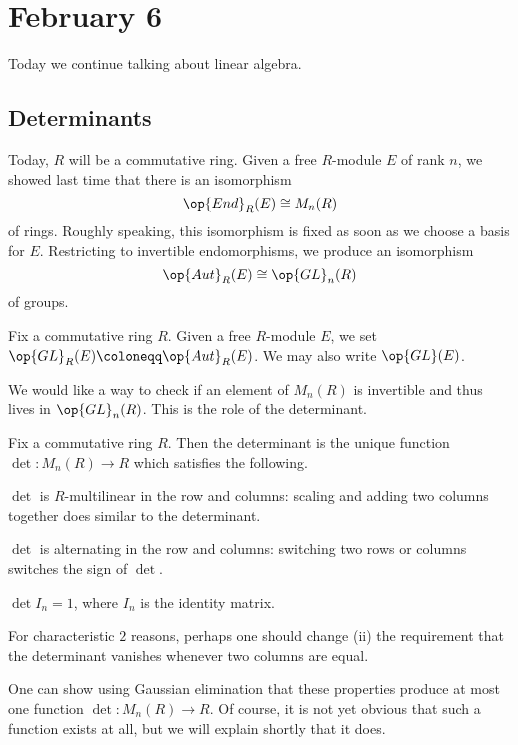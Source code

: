 \documentclass[../notes.tex]{subfiles}
\begin{document}
\section{February 6}

Today we continue talking about linear algebra.

\subsection{Determinants}
Today, $R$ will be a commutative ring. Given a free $R$-module $E$ of rank $n$, we showed last time that there is an isomorphism
\[\op{End}_R(E)\cong M_n(R)\]
of rings. Roughly speaking, this isomorphism is fixed as soon as we choose a basis for $E$. Restricting to invertible endomorphisms, we produce an isomorphism
\[\op{Aut}_R(E)\cong\op{GL}_n(R)\]
of groups.
\begin{notation}
	Fix a commutative ring $R$. Given a free $R$-module $E$, we set $\op{GL}_R(E)\coloneqq\op{Aut}_R(E)$. We may also write $\op{GL}(E)$.
\end{notation}
We would like a way to check if an element of $M_n(R)$ is invertible and thus lives in $\op{GL}_n(R)$. This is the role of the determinant.
\begin{definition}[determinant]
	Fix a commutative ring $R$. Then the determinant is the unique function $\det\colon M_n(R)\to R$ which satisfies the following.
	\begin{listalph}
		\item $\det$ is $R$-multilinear in the row and columns: scaling and adding two columns together does similar to the determinant.
		\item $\det$ is alternating in the row and columns: switching two rows or columns switches the sign of $\det$.
		\item $\det I_n=1$, where $I_n$ is the identity matrix.
	\end{listalph}
\end{definition}
\begin{remark}
	For characteristic $2$ reasons, perhaps one should change (ii) the requirement that the determinant vanishes whenever two columns are equal.
\end{remark}
\begin{remark}
	One can show using Gaussian elimination that these properties produce at most one function $\det\colon M_n(R)\to R$. Of course, it is not yet obvious that such a function exists at all, but we will explain shortly that it does.
\end{remark}
\end{document}
